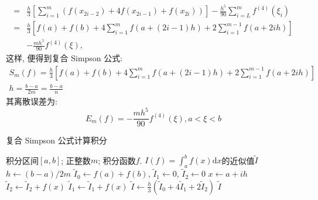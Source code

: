 \documentclass[UTF8,ctexart,a4paper,11pt,openany]{article}
\theoremstyle{definition}
\newcommand\e{\leftarrow}
\begin{document}
\begin{itemize}
$$\begin{aligned}
                = & \frac{h}{3}\left[\sum_{i=1}^{m}\left(f\left(x_{2 i-2}\right)+4 f\left(x_{2 i-1}\right)+f\left(x_{2 i}\right)\right)\right]-\frac{h^{5}}{90} \sum_{i=L}^{m} f^{(4)}\left(\xi_{i}\right) \\
                = & \frac{h}{3}\left[f(a)+f(b)+4 \sum_{i=1}^{m} f(a+(2 i-1) h)+2 \sum_{i=1}^{m-1} f(a+2 i h)\right] \\
                & -\frac{m h^{5}}{90} f^{(4)}(\xi),
                \end{aligned}$$这样, 便得到复合 Simpson 公式: $$\begin{array}{c}S_{m}(f)=\frac{h}{3}\left[f(a)+f(b)+4 \sum_{i=1}^{m} f(a+(2 i-1) h)+2 \sum_{i=1}^{m-1} f(a+2 i h)\right] \\ h=\frac{b-a}{2 m}=\frac{b-a}{n}\end{array}$$ 其离散误差为: $$E_{m}(f)=-\frac{m h^{5}}{90} f^{(4)}(\xi), a<\xi<b$$    
                \begin{algorithm}[H]
                    \caption{复合 Simpson 公式计算积分}
                    \begin{algorithmic}[1] %
                        \Require 积分区间$[a,b]$; 正整数$m$; 积分函数$f$.
                        \Ensure $I(f)=\int_{a}^{b} f(x) \mathrm{d} x$的近似值$\widetilde{I}$
                            \State $h \e (b-a)/2m$
                            \State $\widetilde{I}_0 \e f(a)+f(b)$, $\widetilde{I}_1 \e 0$, $\widetilde{I}_2 \e 0$
                                \State $x\e a+ih$
                                    \State $\widetilde{I}_2 \e \widetilde{I}_2+f(x)$
                                \Else
                                    \State $\widetilde{I}_1 \e \widetilde{I}_1+f(x)$
                                \EndIf
                            \EndFor 
                            \State $\widetilde{I} \e \frac{h}{3}\left(\widetilde{I}_0+4 \widetilde{I}_1+2 \widetilde{I}_2\right)$
                            \State \Return $\widetilde{I}$
                        \EndFunction
                    \end{algorithmic}
                \end{algorithm}

\end{itemize}
\end{document}
